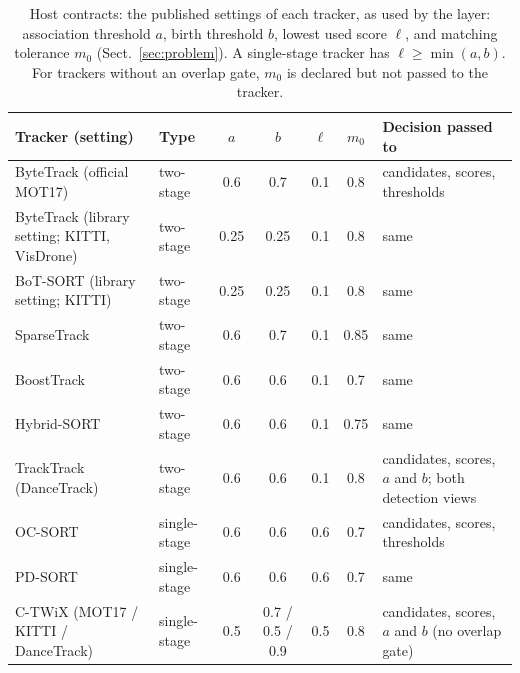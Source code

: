 \begin{table}[t]
\caption{Host contracts: the published settings of each tracker, as used by
the layer: association threshold $a$, birth threshold $b$, lowest used score
$\ell$, and matching tolerance $m_0$ (Sect.~\ref{sec:problem}). A single-stage tracker has $\ell\ge\min(a,b)$. For trackers without
an overlap gate, $m_0$ is declared but not passed to the tracker.}
\label{tab:contracts}
\centering\footnotesize
\setlength{\tabcolsep}{3pt}
\begin{tabular}{@{}>{\raggedright\arraybackslash}p{37mm}lcccc>{\raggedright\arraybackslash}p{29mm}@{}}
\toprule
Tracker (setting) & Type & $a$ & $b$ & $\ell$ & $m_0$ & Decision passed to\\
\midrule
ByteTrack (official MOT17) & two-stage & 0.6 & 0.7 & 0.1 & 0.8 & candidates, scores, thresholds\\
ByteTrack (library setting; KITTI, VisDrone) & two-stage & 0.25 & 0.25 & 0.1 & 0.8 & same\\
BoT-SORT (library setting; KITTI) & two-stage & 0.25 & 0.25 & 0.1 & 0.8 & same\\
SparseTrack & two-stage & 0.6 & 0.7 & 0.1 & 0.85 & same\\
BoostTrack & two-stage & 0.6 & 0.6 & 0.1 & 0.7 & same\\
Hybrid-SORT & two-stage & 0.6 & 0.6 & 0.1 & 0.75 & same\\
TrackTrack (DanceTrack) & two-stage & 0.6 & 0.6 & 0.1 & 0.8 & candidates, scores, $a$ and $b$; both detection views\\
OC-SORT & single-stage & 0.6 & 0.6 & 0.6 & 0.7 & candidates, scores, thresholds\\
PD-SORT & single-stage & 0.6 & 0.6 & 0.6 & 0.7 & same\\
C-TWiX (MOT17 / KITTI / DanceTrack) & single-stage & 0.5 & 0.7 / 0.5 / 0.9 & 0.5 & 0.8 & candidates, scores, $a$ and $b$ (no overlap gate)\\
\bottomrule
\end{tabular}
\end{table}
